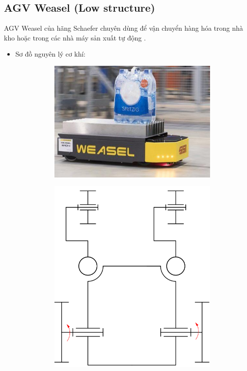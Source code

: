     \subsection{AGV Weasel (Low structure)}
        \hspace*{0.6cm} AGV Weasel của hãng Schaefer chuyên dùng để vận chuyển hàng hóa trong nhà kho hoặc trong các nhà máy sản xuất tự động \cite{agv_weasel}.
        \begin{itemize}
            \item Sơ đồ nguyên lý cơ khí:
            \begin{figure}[H]
                \begin{subfigure}{0.5\textwidth}
                \centering
                \includegraphics[width=0.6\linewidth, right]{pictures/chapter1/chapter1_pic12a_weasle.png} 
                \label{chap1_pic12a}
                \end{subfigure}
                \begin{subfigure}{0.7\textwidth}
                \includegraphics[width=0.55\linewidth]{pictures/chapter1/chapter1_pic12b_newbie.png}
                \label{chap1_pic12b}
                \end{subfigure}

\end{figure}
\end{itemize}
